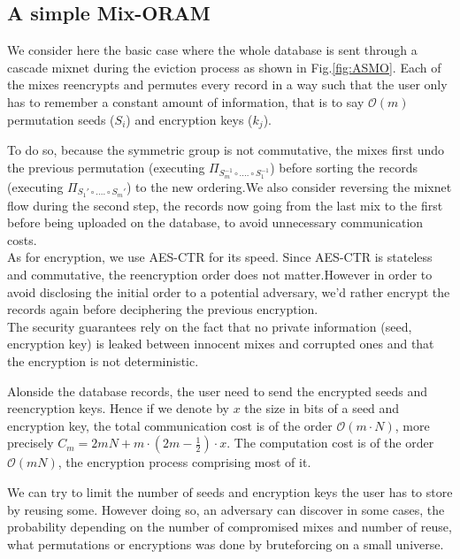 \documentclass[conference]{IEEEtran}
\begin{document}
\subsection{A simple Mix-ORAM}
We consider here the basic case where the whole database is sent through a cascade mixnet during the eviction process as shown in Fig.\ref{fig:ASMO}.
Each of the mixes reencrypts and permutes every record in a way such that the user only has to remember a constant amount of information, that is to say $\mathcal{O}\left ( m \right )$ permutation seeds ($S_i$) and encryption keys ($k_j$).

To do so, because the symmetric group is not commutative, the mixes first undo the previous permutation (executing $\Pi_{S_m^{-1} \circ .... \circ S_1^{-1}}$) before sorting the records (executing $\Pi_{S_1' \circ .... \circ S_m'}$) to the new ordering.We also consider reversing the mixnet flow during the second step, the records now going from the last mix to the first before being uploaded on the database, to avoid unnecessary communication costs.\\
As for encryption, we use AES-CTR for its speed. Since AES-CTR is stateless and commutative, the reencryption order does not matter.However in order to avoid disclosing the initial order to a potential adversary, we'd rather encrypt the records again before deciphering the previous encryption.\\
The security guarantees rely on the fact that no private information (seed, encryption key) is leaked between innocent mixes and corrupted ones and that the encryption is not deterministic.

Alonside the database records, the user need to send the encrypted seeds and reencryption keys. Hence if we denote by $x$ the size in bits of a seed and encryption key, the total communication cost is of the order $\mathcal{O}\left ( m\cdot N \right )$, more precisely $C_m=2mN + m\cdot(2m-\frac{1}{2})\cdot x$.
The computation cost is of the order $\mathcal{O}\left(mN\right)$, the encryption process comprising most of it.

We can try to limit the number of seeds and encryption keys the user has to store by reusing some. However doing so, an adversary can discover in some cases, the probability depending on the number of compromised mixes and number of reuse, what permutations or encryptions was done by bruteforcing on a small universe.
\end{document}
